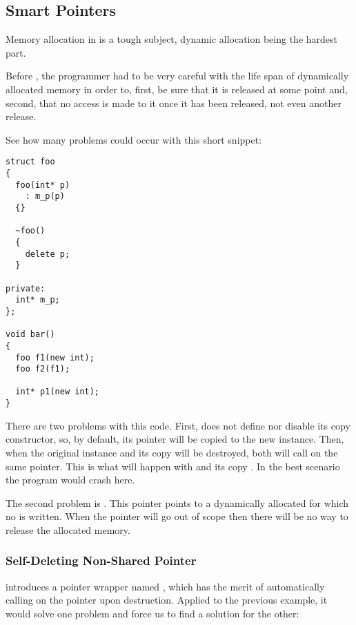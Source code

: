 \subsection{Smart Pointers}

Memory allocation in \cpp{} is a tough subject, dynamic allocation
being the hardest part.

Before , the programmer had to be very careful with the life
span of dynamically allocated memory in order to, first, be sure that
it is released at some point and, second, that no access is made to it
once it has been released, not even another release.

See how many problems could occur with this short snippet:

\begin{lstlisting}
struct foo
{
  foo(int* p)
    : m_p(p)
  {}

  ~foo()
  {
    delete p;
  }

private:
  int* m_p;
};

void bar()
{
  foo f1(new int);
  foo f2(f1);

  int* p1(new int);
}
\end{lstlisting}

There are two problems with this code. First,  does not
define nor disable its copy constructor, so, by default, its
 pointer will be copied to the new instance. Then, when the
original instance and its copy will be destroyed, both will call
 on the same pointer. This is what will happen with
 and its copy . In the best scenario the program
would crash here.

The second problem is . This pointer points to a dynamically
allocated  for which no  is written. When the
pointer will go out of scope then there will be no way to release the
allocated memory.

\subsubsection{Self-Deleting Non-Shared Pointer}

%
%
 introduces a pointer wrapper named ,
which has the merit of automatically calling  on the
pointer upon destruction. Applied to the previous example, it would
solve one problem and force us to find a solution for the other:

